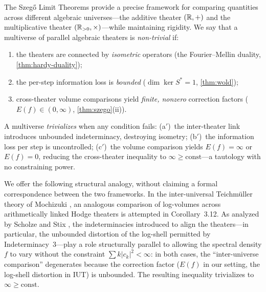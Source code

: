 \begin{remark}
The Szeg\H{o} Limit Theorems provide a precise framework for comparing quantities across different algebraic universes---the additive theater $(\mathbb{R}, +)$ and the multiplicative theater $(\mathbb{R}_{>0}, \times)$---while maintaining rigidity. We say that a multiverse of parallel algebraic theaters is \emph{non-trivial} if:
\begin{enumerate}[label=(\alph*)]
\item the theaters are connected by \emph{isometric} operators (the Fourier--Mellin duality, \cref{thm:hardy-duality});
\item the per-step information loss is \emph{bounded} ($\dim \ker S^* = 1$, \cref{thm:wold});
\item cross-theater volume comparisons yield \emph{finite, nonzero} correction factors ($E(f) \in (0, \infty)$, \cref{thm:szego}(ii)).
\end{enumerate}
A multiverse \emph{trivializes} when any condition fails: (a${}'$)~the inter-theater link introduces unbounded indeterminacy, destroying isometry; (b${}'$)~the information loss per step is uncontrolled; (c${}'$)~the volume comparison yields $E(f) = \infty$ or $E(f) = 0$, reducing the cross-theater inequality to $\infty \geq \text{const}$---a tautology with no constraining power.

We offer the following structural analogy, without claiming a formal correspondence between the two frameworks. In the inter-universal Teichm\"uller theory of Mochizuki \cite{MochizukiIII}, an analogous comparison of log-volumes across arithmetically linked Hodge theaters is attempted in Corollary~3.12. As analyzed by Scholze and Stix \cite{ScholzeStix}, the indeterminacies introduced to align the theaters---in particular, the unbounded distortion of the log-shell permitted by Indeterminacy~3---play a role structurally parallel to allowing the spectral density $f$ to vary without the constraint $\sum k |c_k|^2 < \infty$: in both cases, the ``inter-universe comparison'' degenerates because the correction factor ($E(f)$ in our setting, the log-shell distortion in IUT) is unbounded. The resulting inequality trivializes to $\infty \geq \mathrm{const}$.


\end{remark}
